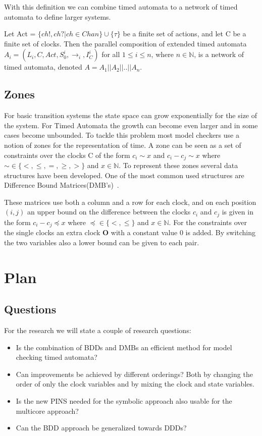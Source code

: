 \documentclass[11pt]{article}
\begin{document}
With this definition we can combine timed automata to a network of timed automata to define larger systems.

\begin{mydef}
\label{def:networkTA}
Let Act = $\{ch!,ch?|ch \in Chan\} \cup \{\tau\}$ be a finite set of actions, and let C be a finite set of clocks. Then the parallel composition of extended timed automata $A_i = (L_i, C, Act, S^i_0, \rightarrow_{i}, I^i_C)$ for all $1 \leq i \leq n$, where $n \in \mathbb{N}$, is a network of timed automata, denoted $A = A_1||A_2||..||A_n$.
\end{mydef}

\subsection{Zones}
For basic transition systems the state space can grow exponentially for the size of the system. For Timed Automata the growth can become even larger and in some cases become unbounded. To tackle this problem most model checkers use a notion of zones for the representation of time. A zone can be seen as a set of constraints over the clocks C of the form $c_i \sim x$ and $c_i - c_j \sim x$ where $\sim  \in \{<, \leq, =, \geq, >\}$ and $x \in \mathbb{N}$. To represent these zones several data structures have been developed. One of the most common used structures are Difference Bound Matrices(DMB's)~\cite{dbmorig,bengtsson2002clocks}.
 
These matrices use both a column and a row for each clock, and on each position $(i,j)$ an upper bound on the difference between the clocks $c_i$ and $c_j$ is given in the form $c_i - c_j \preceq x$ where $\preceq \in \{<, \leq\}$ and $x \in \mathbb{N}$. For the constraints over the single clocks an extra clock $\mathbf{O}$ with a constant value 0 is added. By switching the two variables also a lower bound can be given to each pair.

\section{Plan}

\subsection{Questions}
For the research we will state a couple of research questions:
{\renewcommand\labelitemi{--}
	\begin{itemize}
		\item Is the combination of BDDs and DMBs an efficient method for model checking timed automata?
		\item Can improvements be achieved by different orderings? Both by changing the order of only the clock variables and by mixing the clock and state variables.
		\item Is the new PINS needed for the symbolic approach also usable for the multicore approach?
		\item Can the BDD approach be generalized towards DDDs?
	\end{itemize}
}
\end{document}
